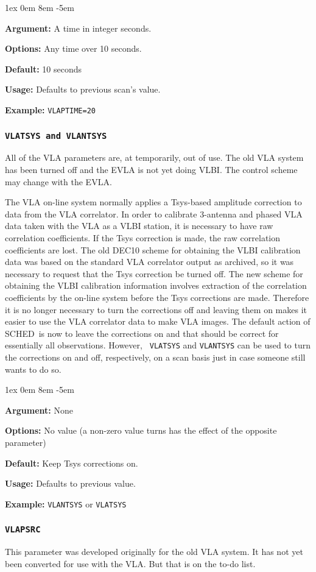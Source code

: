\documentclass{report}
\newcommand{\schedb}{{\sc SCHED~}}
\newcommand{\rcwbox}[5]{
  \begin{list}{}{\parsep 1ex  \itemsep 0em
                 \leftmargin 8em  \itemindent -5em }
    \item {\bf Argument:} #1
    \item {\bf Options:}  #2
    \item {\bf Default:}  #3
    \item {\bf Usage:}    #4
    \item {\bf Example:}  #5
  \end{list}
}
\begin{document}
\rcwbox
{A time in integer seconds.}
{Any time over 10 seconds.}
{10 seconds}
{Defaults to previous scan's value.}
{{\tt VLAPTIME=20}}



\subsubsection{\label{MP:VLATSYS}{\tt VLATSYS and VLANTSYS}}

All of the VLA parameters are, at temporarily, out of use.  The old
VLA system has been turned off and the EVLA is not yet doing VLBI.
The control scheme may change with the EVLA.

The VLA on-line system normally applies a
Tsys-based amplitude correction to data from the VLA correlator.  In
order to calibrate 3-antenna and phased VLA data taken with the VLA as
a VLBI station, it is necessary to have raw correlation coefficients.
If the Tsys correction is made, the raw correlation coefficients are
lost. The old DEC10 scheme for obtaining the VLBI calibration data was
based on the standard VLA correlator output as archived, so it was
necessary to request that the Tsys correction be turned off. The new
scheme for obtaining the VLBI calibration information involves
extraction of the correlation coefficients by the on-line system
before the Tsys corrections are made. Therefore it is no longer
necessary to turn the corrections off and leaving them on makes it
easier to use the VLA correlator data to make VLA images. The default
action of \schedb is now to leave the corrections on and that
should be correct for essentially all observations. However, {\tt
VLATSYS} and {\tt VLANTSYS} can be used to turn the corrections on and
off, respectively, on a scan basis just in case someone still wants to
do so.

\rcwbox
{None}
{No value (a non-zero value turns has the effect of the opposite
parameter)}
{Keep Tsys corrections on.}
{Defaults to previous value.}
{{\tt VLANTSYS} or {\tt VLATSYS}}


\subsubsection{\label{MP:VLAPSRC}{\tt VLAPSRC}}

This parameter was developed originally for the old VLA system.  It has
not yet been converted for use with the VLA.  But that is on the to-do 
list.
\end{document}
